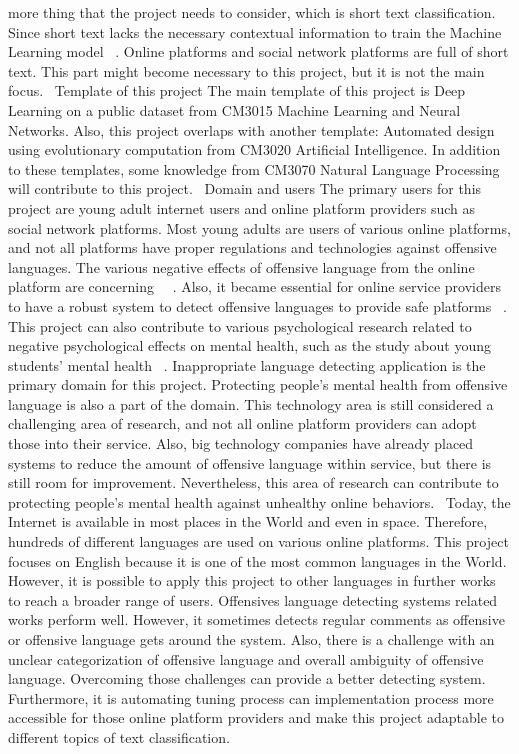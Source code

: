 \documentclass[12pt, natbib=false]{article}
\begin{document}
more thing that the project needs to consider, which is short text classification. Since short text lacks the necessary contextual information to train the Machine Learning model ~\cite{wang2021short}. Online platforms and social network platforms are full of short text. This part might become necessary to this project, but it is not the main focus. 
Template of this project
The main template of this project is Deep Learning on a public dataset from CM3015 Machine Learning and Neural Networks. Also, this project overlaps with another template: Automated design using evolutionary computation from CM3020 Artificial Intelligence. In addition to these templates, some knowledge from CM3070 Natural Language Processing will contribute to this project. 
Domain and users
The primary users for this project are young adult internet users and online platform providers such as social network platforms. Most young adults are users of various online platforms, and not all platforms have proper regulations and technologies against offensive languages. The various negative effects of offensive language from the online platform are concerning ~\cite{babvey2021using}~\cite{shi2021influence}. Also, it became essential for online service providers to have a robust system to detect offensive languages to provide safe platforms ~\cite{vidgen2019challenges}. This project can also contribute to various psychological research related to negative psychological effects on mental health, such as the study about young students’ mental health ~\cite{shi2021influence}.
Inappropriate language detecting application is the primary domain for this project. Protecting people’s mental health from offensive language is also a part of the domain. This technology area is still considered a challenging area of research, and not all online platform providers can adopt those into their service. Also, big technology companies have already placed systems to reduce the amount of offensive language within service, but there is still room for improvement. Nevertheless, this area of research can contribute to protecting people’s mental health against unhealthy online behaviors. 
Today, the Internet is available in most places in the World and even in space. Therefore, hundreds of different languages are used on various online platforms. This project focuses on English because it is one of the most common languages in the World. However, it is possible to apply this project to other languages in further works to reach a broader range of users. Offensives language detecting systems related works perform well. However, it sometimes detects regular comments as offensive or offensive language gets around the system. Also, there is a challenge with an unclear categorization of offensive language and overall ambiguity of offensive language. Overcoming those challenges can provide a better detecting system. Furthermore, it is automating tuning process can implementation process more accessible for those online platform providers and make this project adaptable to different topics of text classification. 
\end{document}
